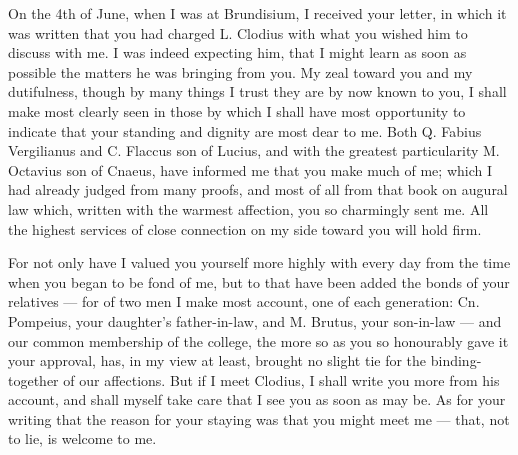 

 On the 4th of June, when I was at Brundisium, I received your letter, in which it was written that you had charged L. Clodius with what you wished him to discuss with me. I was indeed expecting him, that I might learn as soon as possible the matters he was bringing from you. My zeal toward you and my dutifulness, though by many things I trust they are by now known to you, I shall make most clearly seen in those by which I shall have most opportunity to indicate that your standing and dignity are most dear to me. Both Q. Fabius Vergilianus and C. Flaccus son of Lucius, and with the greatest particularity M. Octavius son of Cnaeus, have informed me that you make much of me; which I had already judged from many proofs, and most of all from that book on augural law which, written with the warmest affection, you so charmingly sent me. All the highest services of close connection on my side toward you will hold firm.

 For not only have I valued you yourself more highly with every day from the time when you began to be fond of me, but to that have been added the bonds of your relatives --- for of two men I make most account, one of each generation: Cn. Pompeius, your daughter's father-in-law, and M. Brutus, your son-in-law --- and our common membership of the college, the more so as you so honourably gave it your approval, has, in my view at least, brought no slight tie for the binding-together of our affections. But if I meet Clodius, I shall write you more from his account, and shall myself take care that I see you as soon as may be. As for your writing that the reason for your staying was that you might meet me --- that, not to lie, is welcome to me.
